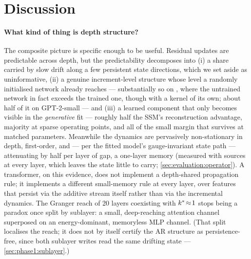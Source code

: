 \section{Discussion}
\label{sec:discussion}

\paragraph{What kind of thing is depth structure?}
The composite picture is specific enough to be useful. Residual updates are
predictable across depth, but the predictability decomposes into (i) a
share carried by slow drift along a few persistent state directions, which
we set aside as uninformative, (ii) a genuine
increment-level structure whose level a randomly initialised network already
reaches --- substantially so on \pythia{}, where the untrained network in
fact exceeds the trained one, though with a kernel of its own; about half of
it on GPT-2-small --- and (iii) a learned component that only becomes visible
in the \emph{generative} fit --- roughly half the SSM's reconstruction
advantage, majority at sparse operating points, and all of the small margin
that survives at matched parameters. Meanwhile the dynamics are pervasively
non-stationary in depth, first-order, and --- per the fitted model's
gauge-invariant state path --- attenuating by half per layer of gap, a
one-layer memory (measured with sources at every layer, which leaves the
state little to carry; \cref{sec:evaluation:operator}). A transformer, on
this evidence, does
not implement a depth-shared propagation rule; it implements a different
small-memory rule at every layer, over features that persist via the additive
stream itself rather than via the incremental dynamics. The Granger reach of
20 layers coexisting with $k^{\ast}\!\approx\!1$ stops being a paradox once
split by sublayer: a small, deep-reaching attention channel superposed on an
energy-dominant, memoryless MLP channel. (That split localises the reach; it
does not by itself certify the AR structure as persistence-free, since both
sublayer writes read the same drifting state --- \cref{sec:phase1:sublayer}.)


